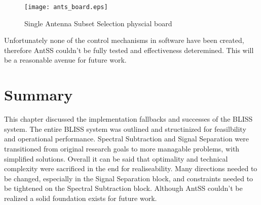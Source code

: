 \begin{figure}[!ht]\label{antss_boards}
\centering
\texttt{[image: ants\_board.eps]}
\caption{Single Antenna Subset Selection physcial board}
\end{figure}

Unfortunately none of the control mechanisms in software have been created, therefore AntSS couldn't be fully tested and effectiveness deteremined.  This will be a reasonable avenue for future work.\\

\section{Summary}

This chapter discussed the implementation fallbacks and successes of the BLISS system.  The entire BLISS system was outlined and structinized for feasilbility and operational performance.  Spectral Subtraction and Signal Separation were transitioned from original research goals to more managable problems, with simplified solutions.  Overall it can be said that optimality and technical complexity were sacrificed in the end for realiseability.  Many directions needed to be changed, especially in the Signal Separation block, and constraints needed to be tightened on the Spectral Subtraction block.  Although AntSS couldn't be realized a solid foundation exists for future work.\\ 




